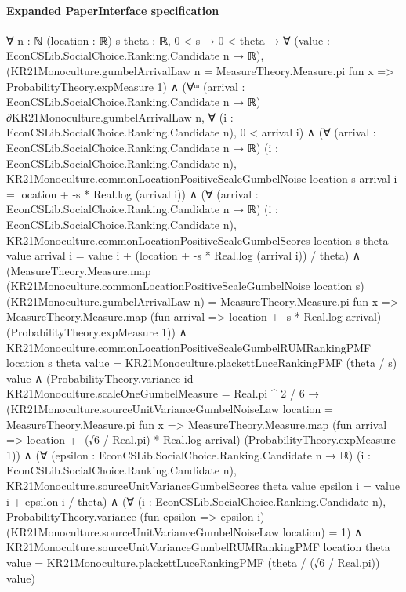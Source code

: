 \documentclass[10pt]{article}
\begin{document}
\paragraph{Expanded PaperInterface specification}
\begin{ReviewVerbatim}
∀ {n : ℕ} (location : ℝ) {s theta : ℝ},
  0 < s →
    0 < theta →
      ∀ (value : EconCSLib.SocialChoice.Ranking.Candidate n → ℝ),
        (KR21Monoculture.gumbelArrivalLaw n = MeasureTheory.Measure.pi fun x => ProbabilityTheory.expMeasure 1) ∧
          (∀ᵐ (arrival : EconCSLib.SocialChoice.Ranking.Candidate n → ℝ) ∂KR21Monoculture.gumbelArrivalLaw n,
              ∀ (i : EconCSLib.SocialChoice.Ranking.Candidate n), 0 < arrival i) ∧
            (∀ (arrival : EconCSLib.SocialChoice.Ranking.Candidate n → ℝ)
                (i : EconCSLib.SocialChoice.Ranking.Candidate n),
                KR21Monoculture.commonLocationPositiveScaleGumbelNoise location s arrival i =
                  location + -s * Real.log (arrival i)) ∧
              (∀ (arrival : EconCSLib.SocialChoice.Ranking.Candidate n → ℝ)
                  (i : EconCSLib.SocialChoice.Ranking.Candidate n),
                  KR21Monoculture.commonLocationPositiveScaleGumbelScores location s theta value arrival i =
                    value i + (location + -s * Real.log (arrival i)) / theta) ∧
                (MeasureTheory.Measure.map (KR21Monoculture.commonLocationPositiveScaleGumbelNoise location s)
                      (KR21Monoculture.gumbelArrivalLaw n) =
                    MeasureTheory.Measure.pi fun x =>
                      MeasureTheory.Measure.map (fun arrival => location + -s * Real.log arrival)
                        (ProbabilityTheory.expMeasure 1)) ∧
                  KR21Monoculture.commonLocationPositiveScaleGumbelRUMRankingPMF location s theta value =
                      KR21Monoculture.plackettLuceRankingPMF (theta / s) value ∧
                    (ProbabilityTheory.variance id KR21Monoculture.scaleOneGumbelMeasure = Real.pi ^ 2 / 6 →
                      (KR21Monoculture.sourceUnitVarianceGumbelNoiseLaw location =
                          MeasureTheory.Measure.pi fun x =>
                            MeasureTheory.Measure.map (fun arrival => location + -(√6 / Real.pi) * Real.log arrival)
                              (ProbabilityTheory.expMeasure 1)) ∧
                        (∀ (epsilon : EconCSLib.SocialChoice.Ranking.Candidate n → ℝ)
                            (i : EconCSLib.SocialChoice.Ranking.Candidate n),
                            KR21Monoculture.sourceUnitVarianceGumbelScores theta value epsilon i =
                              value i + epsilon i / theta) ∧
                          (∀ (i : EconCSLib.SocialChoice.Ranking.Candidate n),
                              ProbabilityTheory.variance (fun epsilon => epsilon i)
                                  (KR21Monoculture.sourceUnitVarianceGumbelNoiseLaw location) =
                                1) ∧
                            KR21Monoculture.sourceUnitVarianceGumbelRUMRankingPMF location theta value =
                              KR21Monoculture.plackettLuceRankingPMF (theta / (√6 / Real.pi)) value)
\end{ReviewVerbatim}
\end{document}
